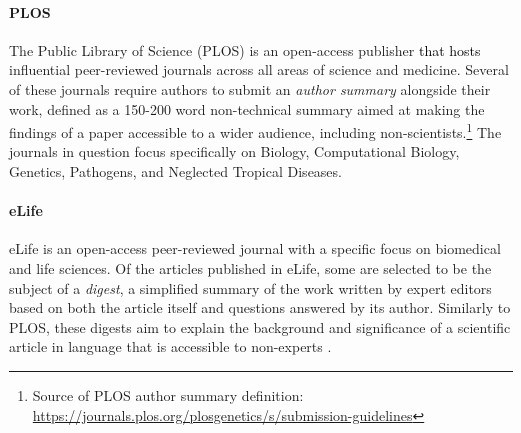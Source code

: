 \documentclass[11pt]{article}
\begin{document}
\paragraph{PLOS} The Public Library of Science (PLOS) is an open-access publisher \textcolor{black}{that hosts} influential peer-reviewed journals across all areas of science and medicine.
Several of these journals require authors to submit an \textit{author summary} alongside their work, defined as a 150-200 word non-technical summary aimed at making the findings of a paper accessible to a wider audience, including non-scientists.\footnote{Source of PLOS author summary definition: \url{https://journals.plos.org/plosgenetics/s/submission-guidelines}}
The journals in question focus specifically on Biology, Computational Biology, Genetics, Pathogens, and Neglected Tropical Diseases.




\paragraph{eLife} eLife is an open-access peer-reviewed journal with a specific focus on biomedical and life sciences. Of the articles published in eLife, some are selected to be the subject of a  \textit{digest}, a simplified summary of the work written by expert editors based on both the article itself and questions answered by its author. Similarly to PLOS, these digests aim to explain the background and significance of a scientific article in language that is accessible to non-experts \citep{elifeDigest}.

 
\begin{table}[t]
    \centering
    \caption{Mean readability scores for abstracts and lay summaries from our datasets. For all metrics, a lower score indicates greater readability.}
    \label{tab:simplicity_scores}
\end{table}
\end{document}
